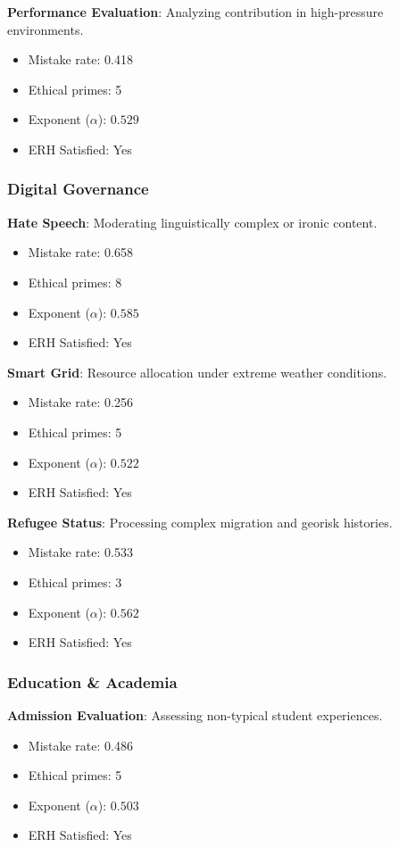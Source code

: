 \documentclass[12pt,a4paper]{article}
\theoremstyle{definition}
\theoremstyle{remark}
\begin{document}
\textbf{Performance Evaluation}: Analyzing contribution in high-pressure environments.
\begin{itemize}
    \item Mistake rate: 0.418
    \item Ethical primes: 5
    \item Exponent ($\alpha$): $0.529$
    \item ERH Satisfied: Yes
\end{itemize}

\subsubsection{Digital Governance}

\textbf{Hate Speech}: Moderating linguistically complex or ironic content.
\begin{itemize}
    \item Mistake rate: 0.658
    \item Ethical primes: 8
    \item Exponent ($\alpha$): $0.585$
    \item ERH Satisfied: Yes
\end{itemize}

\textbf{Smart Grid}: Resource allocation under extreme weather conditions.
\begin{itemize}
    \item Mistake rate: 0.256
    \item Ethical primes: 5
    \item Exponent ($\alpha$): $0.522$
    \item ERH Satisfied: Yes
\end{itemize}

\textbf{Refugee Status}: Processing complex migration and georisk histories.
\begin{itemize}
    \item Mistake rate: 0.533
    \item Ethical primes: 3
    \item Exponent ($\alpha$): $0.562$
    \item ERH Satisfied: Yes
\end{itemize}

\subsubsection{Education \& Academia}

\textbf{Admission Evaluation}: Assessing non-typical student experiences.
\begin{itemize}
    \item Mistake rate: 0.486
    \item Ethical primes: 5
    \item Exponent ($\alpha$): $0.503$
    \item ERH Satisfied: Yes
\end{itemize}
\end{document}
